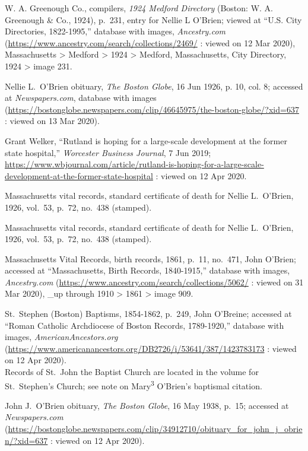 \begin{thebibliography}{999}
W. A. Greenough Co., compilers, \textit{1924 Medford Directory} (Boston: W. A. Greenough \& Co., 1924), p.\ 231, entry for Nellie L O'Brien; viewed at ``U.S. City Directories, 1822-1995,'' database with images, \textit{Ancestry.com} (\url{https://www.ancestry.com/search/collections/2469/} : viewed on 12 Mar 2020), Massachusetts > Medford > 1924 > Medford, Massachusetts, City Directory, 1924 > image 231.

Nellie L.\ O’Brien obituary, \textit{The Boston Globe}, 16 Jun 1926, p. 10, col. 8; accessed at \textit{Newspapers.com}, database with images (\url{https://bostonglobe.newspapers.com/clip/46645975/the-boston-globe/?xid=637} : viewed on 13 Mar 2020). 

Grant Welker, ``Rutland is hoping for a large-scale development at the former state hospital,'' \textit{Worcester Business Journal}, 7 Jun 2019;  \url{https://www.wbjournal.com/article/rutland-is-hoping-for-a-large-scale-development-at-the-former-state-hospital} : viewed on 12 Apr 2020.

Massachusetts vital records, standard certificate of death for Nellie L.\ O'Brien, 1926, vol.\ 53, p.\ 72, no.\ 438 (stamped).

Massachusetts vital records, standard certificate of death for Nellie L.\ O'Brien, 1926, vol.\ 53, p.\ 72, no.\ 438 (stamped).


Massachusetts Vital Records, birth records, 1861, p.\ 11, no.\ 471, John O'Brien; accessed at ``Massachusetts, Birth Records, 1840-1915,'' database with images, \textit{Ancestry.com} (\url{https://www.ancestry.com/search/collections/5062/} : viewed on 31 Mar 2020), \_up through 1910 > 1861 > image 909.

St.\ Stephen (Boston) Baptisms, 1854-1862, p.\ 249, John O'Breine; accessed at ``Roman Catholic Archdiocese of Boston Records, 1789-1920,'' database with images, \textit{AmericanAncestors.org} (\url{https://www.americanancestors.org/DB2726/i/53641/387/1423783173} : viewed on 12 Apr 2020).\\
Records of St.\ John the Baptist Church are located in the volume for St.\ Stephen's Church; see note on Mary\textsuperscript{3} O'Brien's baptismal citation.

John J.\ O'Brien obituary, \textit{The Boston Globe}, 16 May 1938, p.\ 15; accessed at \textit{Newspapers.com} (\url{https://bostonglobe.newspapers.com/clip/34912710/obituary_for_john_j_obrien/?xid=637} : viewed on 12 Apr 2020).


\end{thebibliography}
